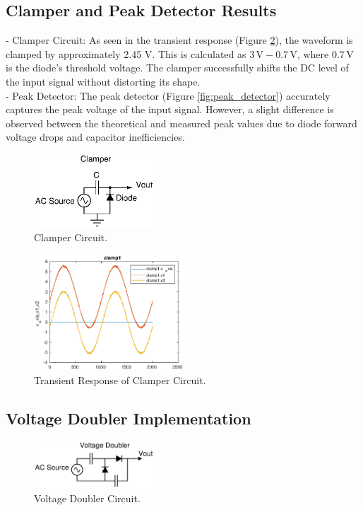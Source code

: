 \documentclass[9pt,conference]{IEEEtran}
\begin{document}
\subsection{Clamper and Peak Detector Results}
- Clamper Circuit: As seen in the transient response (Figure \ref{fig:transient_clamper}), the waveform is clamped by approximately 2.45 V. This is calculated as \(3 \, \text{V} - 0.7 \, \text{V}\), where \(0.7 \, \text{V}\) is the diode's threshold voltage. The clamper successfully shifts the DC level of the input signal without distorting its shape.\\
- Peak Detector: The peak detector (Figure \ref{fig:peak_detector}) accurately captures the peak voltage of the input signal. However, a slight difference is observed between the theoretical and measured peak values due to diode forward voltage drops and capacitor inefficiencies.

\begin{figure}[H]
\centering
\includegraphics[width=0.4\textwidth]{clamper_ckt_pos.eps}
\caption{\label{fig:clamper}Clamper Circuit.}
\end{figure}

\begin{figure}[H]
\centering
\includegraphics[width=0.5\textwidth]{clamp.eps}
\caption{\label{fig:transient_clamper}Transient Response of Clamper Circuit.}
\end{figure}

\subsection{Voltage Doubler Implementation}
\begin{figure}[H]
\centering
\includegraphics[width=0.4\textwidth]{Doubler_ckt.eps}
\caption{\label{fig:voltage_doubler}Voltage Doubler Circuit.}
\end{figure}
\end{document}
